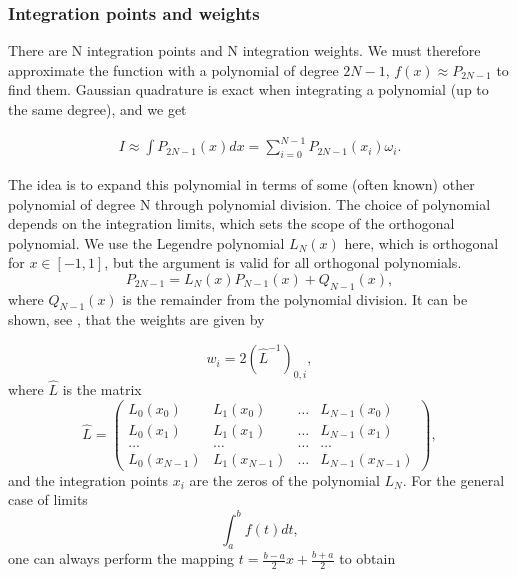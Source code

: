 \documentclass{emulateapj}
\begin{document}
\subsubsection{Integration points and weights}
There are N integration points and N integration weights. We must therefore approximate the function with a polynomial of degree $2N-1$, $f(x) \approx P_{2N-1}$ to find them. Gaussian quadrature is exact when integrating a polynomial (up to the same degree), and we get

\begin{align}
	I \approx \int P_{2N-1}(x)dx = \sum^{N-1}_{i=0}P_{2N-1}(x_i) \omega_i.
\end{align}

The idea is to expand this polynomial in terms of some (often known) other polynomial of degree N through polynomial division. The choice of polynomial depends on the integration limits, which sets the scope of the orthogonal polynomial. We use the Legendre polynomial $L_N(x)$ here, which is orthogonal for $x\in [-1,1]$, but the argument is valid for all orthogonal polynomials.
\begin{equation}
	P_{2N-1} = L_N(x)P_{N-1}(x) + Q_{N-1}(x),
\end{equation}
where $Q_{N-1}(x)$ is the remainder from the polynomial division. It can be shown, see \cite{Lecture1}, that the weights are given by

\begin{equation}
    w_i = 2\left(\hat{L}^{-1}\right)_{0,i},
\end{equation}
where $\hat{L}$ is the matrix
\begin{equation*}
   \hat{L}=\left(\begin{array} {cccc} L_0(x_0)  & L_1(x_0) &\dots &L_{N-1}(x_0)\\
                                   L_0(x_1)  & L_1(x_1) &\dots &L_{N-1}(x_1)\\
                                   \dots  & \dots &\dots &\dots\\
L_0(x_{N-1})  & L_1(x_{N-1}) &\dots &L_{N-1}(x_{N-1})
\end{array}\right),
\end{equation*}
and the integration points $x_i$ are the zeros of the polynomial $L_N$. For the general case of limits
\begin{equation}
    \int_a^b f(t) dt,
\end{equation}
one can always perform the mapping $t = \frac{b-a}{2}x + \frac{b+a}{2}$ to obtain
\end{document}
